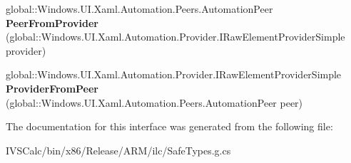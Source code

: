 \begin{DoxyCompactItemize}
global\+::\+Windows.\+U\+I.\+Xaml.\+Automation.\+Peers.\+Automation\+Peer {\bfseries Peer\+From\+Provider} (global\+::\+Windows.\+U\+I.\+Xaml.\+Automation.\+Provider.\+I\+Raw\+Element\+Provider\+Simple provider)
\item 
\mbox{\label{interface_windows_1_1_u_i_1_1_xaml_1_1_automation_1_1_peers_1_1_i_automation_peer_protected_a8d0f0c10723d5bd0c3717eb4b4179694}} 
global\+::\+Windows.\+U\+I.\+Xaml.\+Automation.\+Provider.\+I\+Raw\+Element\+Provider\+Simple {\bfseries Provider\+From\+Peer} (global\+::\+Windows.\+U\+I.\+Xaml.\+Automation.\+Peers.\+Automation\+Peer peer)
\end{DoxyCompactItemize}


The documentation for this interface was generated from the following file\+:\begin{DoxyCompactItemize}
\item 
I\+V\+S\+Calc/bin/x86/\+Release/\+A\+R\+M/ilc/Safe\+Types.\+g.\+cs\end{DoxyCompactItemize}
